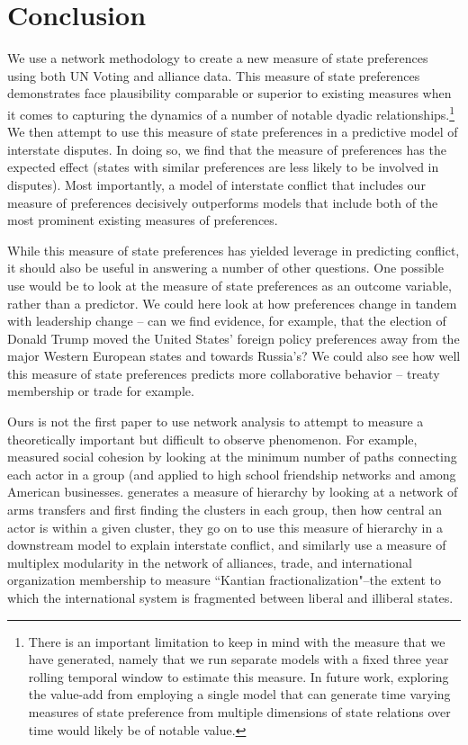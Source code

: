 \section*{Conclusion}

We use a network methodology to create a new measure of state preferences using both UN Voting and alliance data. This measure of state preferences demonstrates face plausibility comparable or superior to existing measures when it comes to capturing the dynamics of a number of notable dyadic relationships.\footnote{There is an important limitation to keep in mind with the measure that we have generated, namely that we run separate models with a fixed three year rolling temporal window to estimate this measure. In future work, exploring the value-add from employing a single model that can generate time varying measures of state preference from multiple dimensions of state relations over time would likely be of notable value.} We then attempt to use this measure of state preferences in a predictive model of interstate disputes. In doing so, we find that the measure of preferences has the expected effect (states with similar preferences are less likely to be involved in disputes). Most importantly, a model of interstate conflict that includes our measure of preferences decisively outperforms models that include both of the most prominent existing measures of preferences.

While this measure of state preferences has yielded leverage in predicting conflict, it should also be useful in answering a number of other questions. One possible use would be to look at the measure of state preferences as an outcome variable, rather than a predictor. We could here look at how preferences change in tandem with leadership change -- can we find evidence, for example, that the election of Donald Trump moved the United States' foreign policy preferences away from the major Western European states and towards Russia's? We could also see how well this measure of state preferences predicts more collaborative behavior -- treaty membership or trade for example.

Ours is not the first paper to use network analysis to attempt to measure a theoretically important but difficult to observe phenomenon. For example, \citet{moody:white:2003} measured social cohesion by looking at the minimum number of paths connecting each actor in a group (and applied to high school friendship networks and among American businesses. \citet{beardsley:etal:2018} generates a measure of hierarchy by looking at a network of arms transfers and first finding the clusters in each group,  then how central an actor is within a given cluster, they go on to use this measure of hierarchy in a downstream model to explain interstate conflict, and similarly \citet{cranmer:etal:2015} use a measure of multiplex modularity in the network of alliances, trade, and international organization membership to measure ``Kantian fractionalization"--the extent to which the international system is fragmented between liberal and illiberal states.

